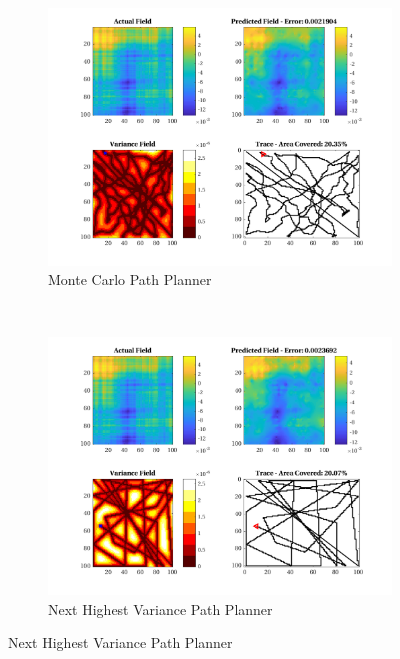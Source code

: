 \begin{figure}[htb!]
    \centering
    \begin{subfigure}[t]{0.5\textwidth}
        \centering
        \includegraphics[width=\linewidth]{figures/hbresults/mc_20p_100x100_sf_100_seed_3.png}
        \captionsetup{skip=0.10\baselineskip,size=footnotesize}
        \caption{Monte Carlo Path Planner}
    \end{subfigure}%
    ~ 
    \begin{subfigure}[t]{0.5\textwidth}
        \centering
        \includegraphics[width=\linewidth]{figures/hbresults/nhv_20p_100x100_sf_100_seed_3.png}
        \captionsetup{skip=0.10\baselineskip,size=footnotesize}
        \caption{Next Highest Variance Path Planner}

\end{subfigure}
\end{figure}
